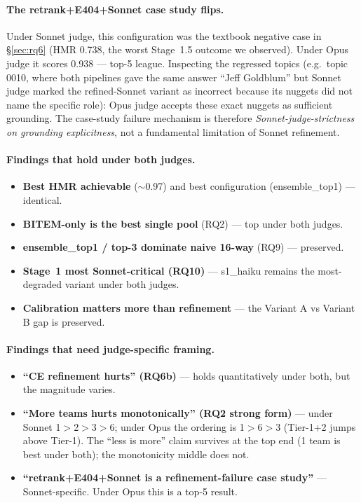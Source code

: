\documentclass[11pt,a4paper]{article}
\newcommand{\HMR}{\textsc{HMR}}
\begin{document}
\paragraph{The retrank+E404+Sonnet case study flips.} Under Sonnet
judge, this configuration was the textbook negative case in
\S\ref{sec:rq6} (\HMR{} 0.738, the worst Stage~1.5 outcome we
observed). Under Opus judge it scores 0.938 — top-5 league.
Inspecting the regressed topics (e.g.\ topic 0010, where both
pipelines gave the same answer ``Jeff Goldblum'' but Sonnet
judge marked the refined-Sonnet variant as incorrect because its
nuggets did not name the specific role): Opus judge accepts these
exact nuggets as sufficient grounding. The case-study failure
mechanism is therefore \emph{Sonnet-judge-strictness on grounding
explicitness}, not a fundamental limitation of Sonnet refinement.

\paragraph{Findings that hold under both judges.}
\begin{itemize}
  \item \textbf{Best HMR achievable} ($\sim$0.97) and best
    configuration (ensemble\_top1) — identical.
  \item \textbf{BITEM-only is the best single pool} (RQ2) — top
    under both judges.
  \item \textbf{ensemble\_top1 / top-3 dominate naive 16-way}
    (RQ9) — preserved.
  \item \textbf{Stage~1 most Sonnet-critical (RQ10)} — s1\_haiku
    remains the most-degraded variant under both judges.
  \item \textbf{Calibration matters more than refinement} — the
    Variant A vs Variant B gap is preserved.
\end{itemize}

\paragraph{Findings that need judge-specific framing.}
\begin{itemize}
  \item \textbf{``CE refinement hurts'' (RQ6b)} — holds quantitatively
    under both, but the magnitude varies.
  \item \textbf{``More teams hurts monotonically'' (RQ2 strong
    form)} — under Sonnet 1$>$2$>$3$>$6; under Opus the ordering is
    1$>$6$>$3 (Tier-1+2 jumps above Tier-1). The ``less is more''
    claim survives at the top end (1 team is best under both); the
    monotonicity middle does not.
  \item \textbf{``retrank+E404+Sonnet is a refinement-failure case
    study''} — Sonnet-specific. Under Opus this is a top-5 result.
\end{itemize}
\end{document}
